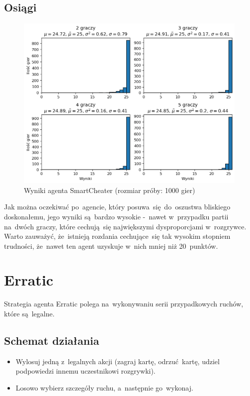 \documentclass[declaration,shortabstract,inz]{iithesis}
\begin{document}
\subsection*{Osiągi}

\begin{figure}[H]
	\centering
	\captionsetup{format=hang}
	\includegraphics[width=\textwidth,height=\textheight,keepaspectratio]{SmartCheater.png}
	\caption[Caption]{Wyniki agenta SmartCheater (rozmiar próby: 1000 gier)}
	\label{fig:SmartCheater}
\end{figure}

Jak można oczekiwać po~agencie, który posuwa~się do~oszustwa bliskiego doskonałemu, jego wyniki są~bardzo wysokie -~nawet w~przypadku partii na~dwóch graczy, które cechują~się największymi dysproporcjami w~rozgrywce. Warto zauważyć, że~istnieją rozdania cechujące~się tak wysokim stopniem trudności, że~nawet ten agent uzyskuje w~nich mniej niż 20~punktów.

\section{Erratic}

Strategia agenta Erratic polega na~wykonywaniu serii przypadkowych ruchów, które są~legalne.

\subsection*{Schemat działania}

\begin{itemize}
	\item Wylosuj jedną z~legalnych akcji (zagraj kartę, odrzuć kartę, udziel podpowiedzi innemu uczestnikowi rozgrywki).
	\item Losowo wybierz szczegóły ruchu, a~następnie go~wykonaj.
\end{itemize}
\end{document}
